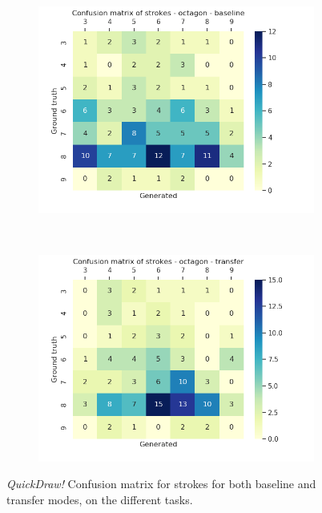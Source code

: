 \begin{figure}[!htbp]
      ~
      \begin{subfigure}[tb]{0.45\textwidth}
          \includegraphics[width=\textwidth]{images/sota/quickdraw_results/quickdraw_octagon_target_strokes_heatmap.png}
      \end{subfigure}
      ~
      \begin{subfigure}[tb]{0.45\textwidth}
          \includegraphics[width=\textwidth]{images/sota/quickdraw_results/quickdraw_octagon_transfer_strokes_heatmap.png}
      \end{subfigure}

      \caption{\textit{QuickDraw!} Confusion matrix for strokes for both baseline and transfer modes, on the different tasks.}
      \label{fig:quickdraw_strokes_cnf}
    \end{figure}

